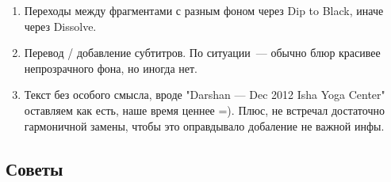 \documentclass[
a4paper, %
12pt, %
article,
onecolumn, %
openany, %
]{memoir}
\begin{document}
\begin{enumerate}
\item Переходы между фрагментами с разным фоном через Dip to Black, иначе через Dissolve.


\item Перевод / добавление субтитров. По ситуации~--- обычно блюр красивее непрозрачного фона, но иногда нет. 

\item Текст без особого смысла, вроде "Darshan — Dec 2012
    Isha Yoga Center" оставляем как есть, наше время ценнее =). 
    {\color{gray}Плюс, не 
   встречал достаточно гармоничной замены, чтобы это оправдывало добаление
   не важной инфы.}
\end{enumerate}

\subsection{Советы}
\end{document}

